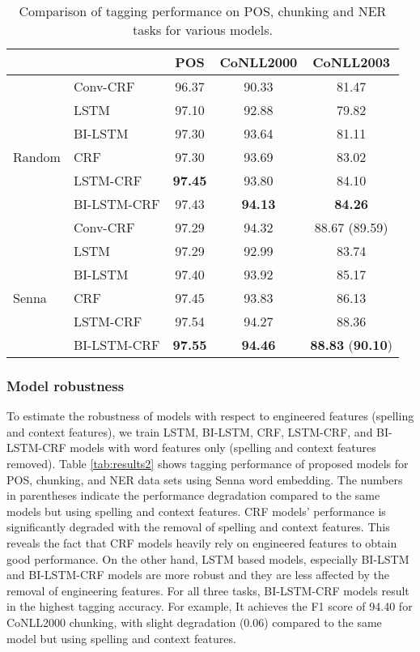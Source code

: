 \documentclass[11pt,a4paper]{article}
\begin{document}
\begin{table*}[!hbt]
\begin{center} 
\caption{Comparison of tagging performance on POS, chunking and NER tasks for various models.}
\label{tab:results}
\begin{tabular}{l|l|c|c|c}
\hline
& &  POS & CoNLL2000 & CoNLL2003 \\ \hline
& Conv-CRF  \cite{collobert1} & 96.37 & 90.33 &  81.47 \\ 
& LSTM & 97.10 & 92.88 & 79.82 \\
& BI-LSTM & 97.30 & 93.64 & 81.11 \\
Random & CRF & 97.30 & 93.69 & 83.02 \\ 
& LSTM-CRF & \textbf{97.45} & 93.80 & 84.10 \\
& BI-LSTM-CRF & 97.43 & \textbf{94.13} & \textbf{84.26} \\ \hline
& Conv-CRF \cite{collobert1} & 97.29 & 94.32 &  88.67 (89.59) \\ 
& LSTM & 97.29 & 92.99 & 83.74 \\
& BI-LSTM & 97.40 & 93.92 & 85.17 \\
Senna & CRF &  97.45 & 93.83 & 86.13 \\ 
 & LSTM-CRF & 97.54 & 94.27 & 88.36 \\
& BI-LSTM-CRF & \textbf{97.55} & \textbf{94.46} & \textbf{88.83} (\textbf{90.10}) \\ \hline
\end{tabular}
\end{center}
\end{table*}

\subsubsection{Model robustness}
To estimate the robustness of models with respect to engineered features (spelling and context features), we train LSTM, BI-LSTM, CRF, LSTM-CRF, and BI-LSTM-CRF models with word features only (spelling and context features removed). Table \ref{tab:results2} shows tagging performance of proposed models for POS, chunking, and NER data sets using Senna word embedding. The numbers in parentheses indicate the performance degradation compared to the same models but using spelling and context features. CRF models' performance is significantly degraded with the removal of spelling and context features. This reveals the fact that CRF models heavily rely on engineered features to obtain good performance. On the other hand, LSTM based models, especially BI-LSTM and BI-LSTM-CRF models are more robust and they are less affected by the removal of engineering features.  For all three tasks, BI-LSTM-CRF models result in the highest tagging accuracy. For example, It achieves the F1 score of 94.40 for CoNLL2000 chunking, with slight degradation (0.06) compared to the same model but using spelling and context features.
\end{document}
